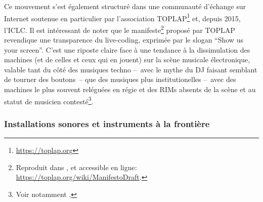 \indent Ce mouvement s'est également structuré dans une communauté d'échange sur Internet soutenue en particulier par l'association TOPLAP\footnote{\url{https://toplap.org}} et, depuis 2015, l'\gls{ICLC}. Il est intéressant de noter que le manifeste\footnote{Reproduit dans \cite{blackwell_programming_2005}, et accessible en ligne: \url{https://toplap.org/wiki/ManifestoDraft}.} proposé par TOPLAP revendique une transparence du live-coding, exprimée par le slogan ``Show us your screen''. C'est une riposte claire face à une tendance à la dissimulation des machines (et de celles et ceux qui en jouent) sur la scène musicale électronique, valable tant du côté des musiques techno --~avec le mythe du \gls{DJ} faisant semblant de tourner des boutons~-- que des musiques plus institutionelles --~avec des machines le plus souvent reléguées en régie et des \glspl{RIM} absents de la scène et au statut de musicien contesté\footnote{Voir notamment \cite{zattra_les_2013}.}.



\subsubsection{Installations sonores et instruments à la frontière}

